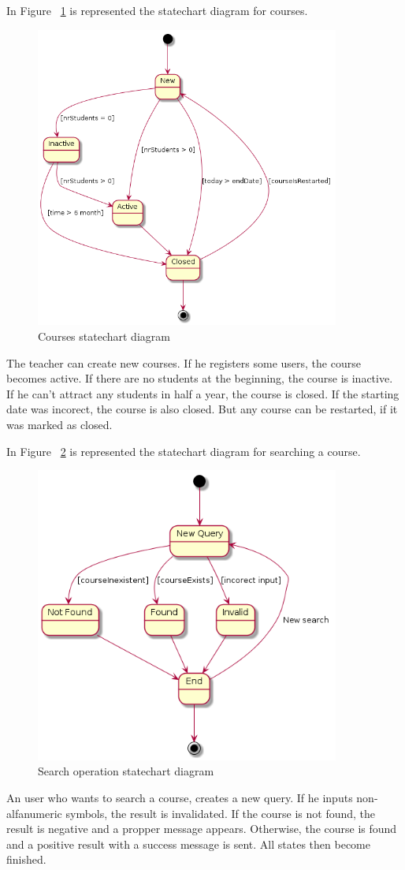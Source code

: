 \documentclass[12pt,a4paper,titlepage]{article}
\begin{document}
In Figure ~\ref{fig:courses} is represented the statechart diagram for courses.
\begin{figure}[H]
\centering
	\includegraphics[width=10cm]{courses}
	\caption{Courses statechart diagram}
	\label{fig:courses}
\end{figure}
The teacher can create new courses. If he registers some users, the course becomes active. If there are no students at the beginning, the course is inactive. If he can't attract any students in half a year, the course is closed. If the starting date was incorect, the course is also closed. But any course can be restarted, if it was marked as closed.

In Figure ~\ref{fig:search} is represented the statechart diagram for searching a course.
\begin{figure}[H]
\centering
\includegraphics[width=10cm]{search}
\caption{Search operation statechart diagram}
\label{fig:search}
\end{figure}
An user who wants to search a course, creates a new query. If he inputs non-alfanumeric symbols, the result is invalidated. If the course is not found, the result is negative and a propper message appears. Otherwise, the course is found and a positive result with a success message is sent. All states then become finished.
\end{document}
